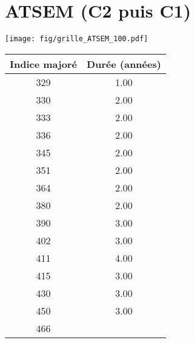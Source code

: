\newpage 
 
\chapter{ATSEM (C2 puis C1)} 

\begin{minipage}{0.55\linewidth}\texttt{[image: fig/grille\_ATSEM\_100.pdf]}\end{minipage} 
\begin{minipage}{0.3\linewidth} 
 \begin{center} 

\begin{tabular}[htb]{|c|c|} 
\hline 
 Indice majoré &  Durée (années) \\ 
\hline \hline 
 329 &  1.00 \\ 
\hline 
 330 &  2.00 \\ 
\hline 
 333 &  2.00 \\ 
\hline 
 336 &  2.00 \\ 
\hline 
 345 &  2.00 \\ 
\hline 
 351 &  2.00 \\ 
\hline 
 364 &  2.00 \\ 
\hline 
 380 &  2.00 \\ 
\hline 
 390 &  3.00 \\ 
\hline 
 402 &  3.00 \\ 
\hline 
 411 &  4.00 \\ 
\hline 
 415 &  3.00 \\ 
\hline 
 430 &  3.00 \\ 
\hline 
 450 &  3.00 \\ 
\hline 
 466 &   \\ 
\hline 
\hline 
\end{tabular} 
\end{center} 
 \end{minipage} 

~\\ 
 


   
 \localtableofcontents 

~\\ 
 

